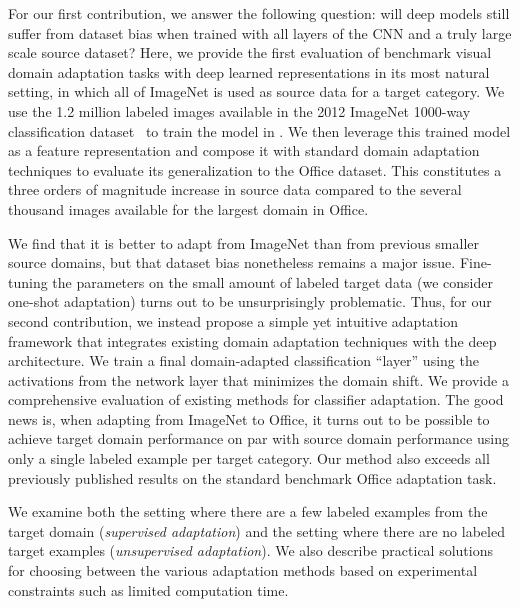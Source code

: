 For our first contribution, we answer the following question: will deep models still suffer from dataset
bias when trained with all layers of the CNN and a truly large scale source
dataset?
Here, we provide the first evaluation of benchmark visual domain adaptation
tasks with deep learned representations in its most natural setting, in which
all of ImageNet is used as source data for a target category.  We use the 1.2
million labeled images available in the 2012 ImageNet 1000-way classification
dataset~\cite{ilsvrc2012} to train the model in \cite{supervision}.  We then
leverage this trained model as a feature representation and compose it with
standard domain adaptation techniques to evaluate its generalization to the
Office dataset.  This constitutes a three orders of magnitude increase in source
data compared to the several thousand images available for the largest domain in
Office.

We find that it is better to adapt from ImageNet than from previous smaller source domains, but  that dataset bias nonetheless remains a major issue. Fine-tuning the parameters on the small amount of labeled target data (we consider one-shot adaptation) turns out to be unsurprisingly problematic. Thus, for our second contribution, we instead propose a simple yet intuitive adaptation framework that integrates existing domain adaptation techniques with the deep architecture. We train a final domain-adapted classification ``layer'' using the activations from the network layer that minimizes the domain shift. 
We provide a comprehensive evaluation of existing methods for classifier adaptation.
The good news is, when adapting from ImageNet to Office, it turns out to be possible to achieve target domain performance on par with source domain performance using only a single labeled example per target category.
Our method also exceeds all previously published results on the standard benchmark Office adaptation task.

We examine both the setting where there are a few labeled examples from the target domain (\emph{supervised adaptation}) and the setting where there are no labeled target examples (\emph{unsupervised adaptation}). We also describe practical solutions for choosing between the various adaptation methods based on experimental constraints such as limited computation time. 
